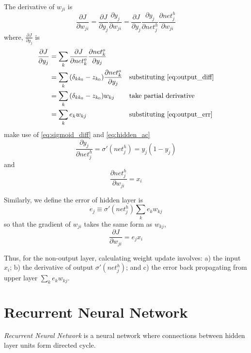 \documentclass[12pt]{article}
\numberwithin{equation}{section}
\begin{document}
The derivative of $w_{ji}$ is
\begin{equation} \label{eq:hidden_diff_w}
    \frac{\partial J}{\partial w_{ji}} = \frac{\partial J}{\partial y_j}\frac{\partial y_j}{\partial w_{ji}} 
                                             = \frac{\partial J}{\partial y_j}\frac{\partial y_j}{\partial net^h_j}\frac{\partial net^h_j}{\partial w_{ji}}
\end{equation}
where, $\frac{\partial J}{\partial y_j}$ is
\begin{align} \label{eq:hidden_diff}
    \frac{\partial J}{\partial y_j} &= \sum_k{\frac{\partial J}{\partial net^o_k}\frac{\partial net^o_k}{\partial y_j}}   && \nonumber \\
                                               &=   \sum_k{(\delta_{kk_0} - z_{k_0})\frac{\partial net^o_k}{\partial y_j}}     && \text{substituting \eqref{eq:output_diff}} \nonumber \\
                                               &=   \sum_k{(\delta_{kk_0} - z_{k_0})w_{kj}}    && \text{take partial derivative} \nonumber \\
                                               &=   \sum_k{e_k w_{kj}}   &&\text{substituting \eqref{eq:output_err}} 
\end{align}
make use of \eqref{eq:sigmoid_diff} and \eqref{eq:hidden_ac}
\begin{equation} \label{eq:hidden_diff_net}
   \frac{\partial y_j}{\partial net^h_j} = \sigma'(net^h_j) =  y_j(1 - y_j)
\end{equation}
and
\begin{equation} \label{eq:hidden_net_diff_w}
   \frac{\partial net^h_j}{\partial w_{ji}} = x_i
\end{equation}

Similarly, we define the error of hidden layer is
\begin{equation}
    e_j \equiv \sigma'(net^h_j) \sum_k{e_k w_{kj}}
\end{equation}
so that the gradient of $w_{ji}$ takes the same form as $w_{kj}$,
\begin{equation}
    \frac{\partial J}{\partial w_{ji}} = e_j x_i 
\end{equation}

Thus, for the non-output layer, calculating weight update involves: a) the input $x_i$; b) the derivative of output $\sigma'(net^h_j)$; 
and c) the error back propagating from upper layer $\sum_k{e_k w_{kj}} $.  

\section{Recurrent Neural Network}
\textit{Recurrent Neural Network}\cite{mikolov2012statistical} is a neural network where connections between hidden layer units form directed cycle. 
\end{document}
